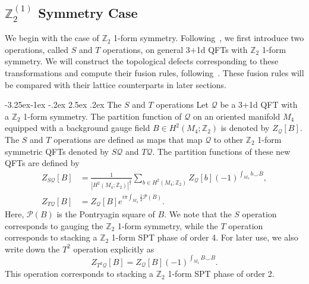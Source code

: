 \documentclass[aps,twocolumn,prx,floatfix,preprintnumbers, nofootinbib,10pt]{revtex4-2}
\makeatletter
\numberwithin{equation}{section}
\theoremstyle{definition}
\theoremstyle{remark}
\theoremstyle{claim}
\newcommand{\Z}{{\mathbb Z}}
\renewcommand\subsubsection{\@startsection{subsubsection}{3}{\z@}%
                                     {-3.25ex\@plus -1ex \@minus -.2ex}%
                                     {2.5ex \@plus .2ex}%
                                     {\centering\itshape\bfseries\small}}
\makeatother
\begin{document}
\subsection{$\Z_2^{(1)}$ Symmetry Case}
\label{sec: continuum fusion rules Z2}
We begin with the case of $\mathbb{Z}_2$ 1-form symmetry.
Following~\cite{Gaiotto:2014kfa, BhardwajLeeTachikawa2020}, we first introduce two operations, called $S$ and $T$ operations, on general 3+1d QFTs with $\mathbb{Z}_2$ 1-form symmetry.
We will construct the  topological defects corresponding to these transformations  and compute their fusion rules, following~\cite{Choi:2021kmx, Choi:2022zal}.
These fusion rules will be compared with their lattice counterparts in later sections.

\subsubsection{The $S$ and $T$ operations}
Let $\mathcal{Q}$ be a 3+1d QFT with a $\mathbb{Z}_2$ 1-form symmetry.
The partition function of $\mathcal{Q}$ on an oriented manifold $M_4$ equipped with a background gauge field $B \in H^2(M_4; \mathbb{Z}_2)$ is denoted by $Z_{\mathcal{Q}}[B]$.
The $S$ and $T$ operations are defined as maps that map $\mathcal{Q}$ to other $\mathbb{Z}_2$ 1-form symmetric QFTs denoted by $S\mathcal{Q}$ and $T\mathcal{Q}$.
The partition functions of these new QFTs are defined by
\begin{align}
Z_{S\mathcal{Q}}[B] &= \frac{1}{|H^2(M_4; \mathbb{Z}_2)|^{\frac{1}{2}}} \sum_{b \in H^2(M_4; \mathbb{Z}_2)} Z_{\mathcal{Q}}[b] (-1)^{\int_{M_4} b \smile B}, \\
Z_{T \mathcal{Q}}[B] &= Z_{\mathcal{Q}}[B] e^{i \pi \int_{M_4} \frac{1}{2} \mathcal{P}(B)}.
\end{align}
Here, $\mathcal{P}(B)$ is the Pontryagin square of $B$.
We note that the $S$ operation corresponds to gauging the $\mathbb{Z}_2$ 1-form symmetry, while the $T$ operation corresponds to stacking a $\mathbb{Z}_2$ 1-form SPT phase of order 4.
For later use, we also write down the $T^2$ operation explicitly as
\begin{equation}
Z_{T^2\mathcal{Q}}[B] = Z_{\mathcal{Q}}[B] (-1)^{\int_{M_4} B \smile B}.
\end{equation}
This operation corresponds to stacking a $\mathbb{Z}_2$ 1-form SPT phase of order 2. %
\end{document}
